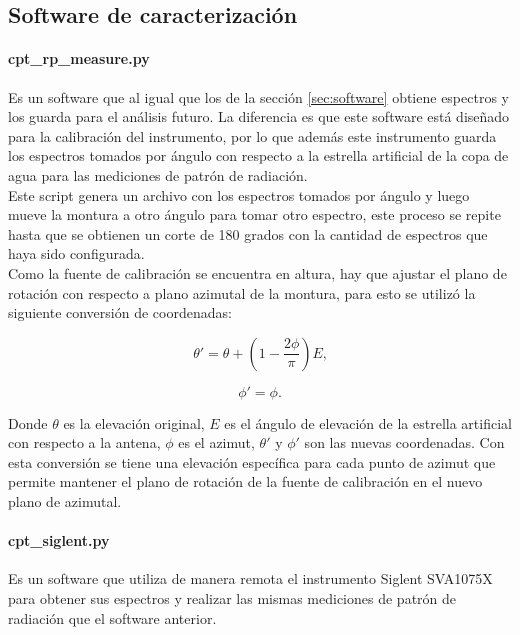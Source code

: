 \subsection{Software de caracterización}

\paragraph{cpt\_rp\_measure.py} Es un software que al igual que los de la sección \ref{sec:software} obtiene espectros y los guarda para el análisis futuro. La diferencia es que este software está diseñado para la calibración del instrumento, por lo que además este instrumento guarda los espectros tomados por ángulo con respecto a la estrella artificial de la copa de agua para las mediciones de patrón de radiación.\\

Este script genera un archivo con los espectros tomados por ángulo y luego mueve la montura a otro ángulo para tomar otro espectro, este proceso se repite hasta que se obtienen un corte de 180 grados con la cantidad de espectros que haya sido configurada.\\

Como la fuente de calibración se encuentra en altura, hay que ajustar el plano de rotación con respecto a plano azimutal de la montura, para esto se utilizó la siguiente conversión de coordenadas:

\begin{equation}
    \theta' = \theta + \left(1- \frac{2\phi}{\pi}\right)E\text{,}
\end{equation}

\begin{equation}
    \phi' = \phi\text{.}
\end{equation}

Donde $\theta$ es la elevación original, $E$ es el ángulo de elevación de la estrella artificial con respecto a la antena, $\phi$ es el azimut, $\theta'$ y $\phi'$ son las nuevas coordenadas. Con esta conversión se tiene una elevación específica para cada punto de azimut que permite mantener el plano de rotación de la fuente de calibración en el nuevo plano de azimutal.\\

\paragraph{cpt\_siglent.py} Es un software que utiliza de manera remota el instrumento Siglent SVA1075X para obtener sus espectros y realizar las mismas mediciones de patrón de radiación que el software anterior.\\